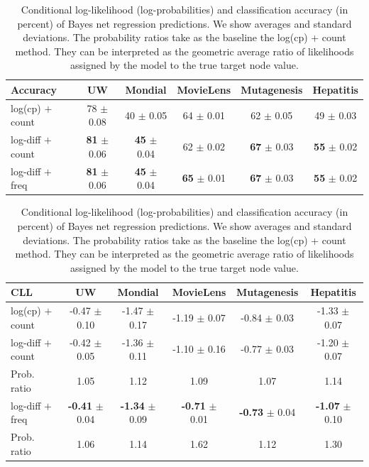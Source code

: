 \documentclass[twoside,11pt]{article}
\begin{document}
 
\begin{table}[thbp]
\caption{Conditional log-likelihood (log-probabilities) and classification accuracy (in percent) of Bayes net regression predictions. We show averages and standard deviations. The probability ratios take as the baseline the log(cp) + count method. They can be interpreted as the geometric average ratio of likelihoods assigned by the model to the true target node value.}


\begin{center}
\begin{tabular}{|l|c|c|c|c|c|}
\hline
Accuracy& UW & Mondial & MovieLens & Mutagenesis & Hepatitis \\\hline
log(cp) $+$ count & 78 $\pm$ 0.08 & 40 $\pm$ 0.05 & 64 $\pm$ 0.01 & 62 $\pm$ 0.05 & 49 $\pm$ 0.03 \\
log-diff $+$ count & \textbf{81} $\pm$ 0.06 & \textbf{45} $\pm$ 0.04 & 62 $\pm$ 0.02 & \textbf{67} $\pm$ 0.03 & \textbf{55} $\pm$ 0.02 \\
log-diff $+$ freq & \textbf{81} $\pm$ 0.06 & \textbf{45} $\pm$ 0.04 & \textbf{65} $\pm$ 0.01 & \textbf{67} $\pm$ 0.03 & \textbf{55} $\pm$ 0.02 \\
\hline
\end{tabular}
\end{center}

\begin{center}
\begin{tabular}{|l|c|c|c|c|c|}
\hline
CLL & UW & Mondial & MovieLens & Mutagenesis & Hepatitis \\\hline
log(cp) $+$ count & -0.47 $\pm$ 0.10 & -1.47 $\pm$ 0.17 & -1.19 $\pm$ 0.07 & -0.84 $\pm$ 0.03 & -1.33 $\pm$ 0.07 \\
log-diff $+$ count & -0.42 $\pm$ 0.05 & -1.36 $\pm$ 0.11 & -1.10 $\pm$ 0.16 & -0.77 $\pm$ 0.03 & -1.20 $\pm$ 0.07\\
Prob. ratio & 1.05 & 1.12 & 1.09 & 1.07 & 1.14\\\hline
log-diff $+$ freq & \textbf{-0.41} $\pm$ 0.04 & \textbf{-1.34} $\pm$ 0.09 & \textbf{-0.71} $\pm$ 0.01 & \textbf{-0.73} $\pm$ 0.04 & \textbf{-1.07} $\pm$ 0.10\\
Prob. ratio & 1.06 & 1.14 & 1.62 & 1.12 & 1.30\\
\hline
\end{tabular}
\end{center}
\label{table:bn}
\end{table}%
\end{document}
